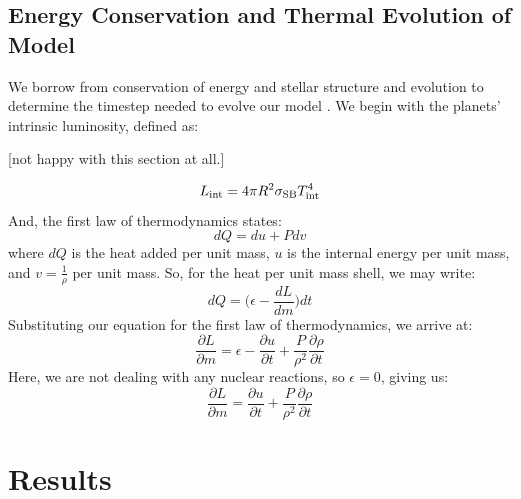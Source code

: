 \documentclass[11pt]{ucscthesisbs}
\begin{document}
\section{Energy Conservation and Thermal Evolution of Model}
We borrow from conservation of energy and stellar structure and evolution to determine the timestep needed to evolve our model \citep{kippenhahn_2012}. We begin with the planets' intrinsic luminosity, defined as:

[not happy with this section at all.]

\begin{equation}
L_{\rm int} = 4\pi R^2\sigma_{\rm SB}T_{\rm int}^4
\label{eq:intrinsic_luminosity}
\end{equation}
And, the first law of thermodynamics states:
\begin{equation}
dQ = du + Pdv
\label{eq:first_law_thermodynamics}
\end{equation}
where $dQ$ is the heat added per unit mass, $u$ is the internal energy per unit mass, and $v = \frac{1}{\rho}$ per unit mass.
So, for the heat per unit mass shell, we may write:
\begin{equation}
dQ = \big(\epsilon - \frac{dL}{dm})dt
\label{eq:heat_per_unit_mass_shell}
\end{equation}
Substituting our equation for the first law of thermodynamics, we arrive at:
\begin{equation}
\frac{\partial L}{\partial m} = \epsilon - \frac{\partial u}{\partial t} + \frac{P}{\rho^2}\frac{\partial \rho}{\partial t}
\end{equation}
Here, we are not dealing with any nuclear reactions, so $\epsilon = 0$, giving us:
\begin{equation}
\frac{\partial L}{\partial m} = \frac{\partial u}{\partial t} + \frac{P}{\rho^2}\frac{\partial \rho}{\partial t}
\end{equation}



\chapter{Results}
\end{document}
